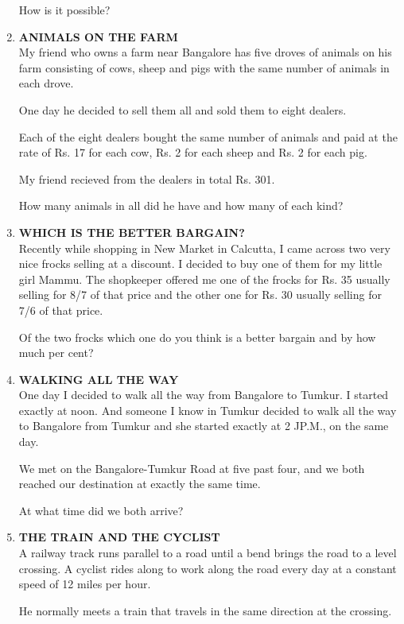 \documentclass[12pt]{article}
\begin{document}
\begin{enumerate}
How  is it possible? 
%
\item \textbf{ANIMALS  ON  THE  FARM} \\
My friend  who  owns  a farm  near  Bangalore  has  five droves  of animals  on his farm  consisting  of cows,  sheep and pigs  with  the  same  number  of animals  in each drove. 

One day he decided  to sell them  all and sold  them  to eight  dealers. 

Each  of the eight  dealers  bought  the same  number  of animals  and  paid  at the  rate  of Rs. 17 for  each  cow, Rs. 2 for each  sheep  and Rs. 2 for each  pig. 

My friend  recieved  from  the  dealers  in total  Rs. 301. 

How  many  animals  in all did he have  and  how  many of each  kind? 
%
\item \textbf{WHICH  IS THE  BETTER  BARGAIN?} \\
Recently  while  shopping  in New  Market  in Calcutta, I came  across  two very  nice  frocks  selling  at a discount. I decided  to buy  one  of them  for my little  girl Mammu. The shopkeeper  offered  me one of the  frocks  for Rs.  35 usually  selling  for 8/7 of  that  price  and the other  one for 
Rs. 30 usually  selling  for  7/6 of that  price. 

Of the two frocks  which  one do you think  is a better bargain  and by how  much  per cent? 
%
\item \textbf{WALKING  ALL  THE  WAY} \\
One day I decided  to walk  all the  way  from  Bangalore to Tumkur.  I started  exactly  at noon.  And  someone  I know  in Tumkur  decided  to walk  all the way  to Bangalore from  Tumkur  and  she  started  exactly  at 2 JP.M.,  on the same  day. 

We met  on the  Bangalore-Tumkur  Road  at five past four,  and we both  reached  our destination  at exactly  the same  time. 

At what  time  did we both  arrive? 
%
\item \textbf{THE  TRAIN  AND  THE  CYCLIST} \\
A railway  track  runs  parallel  to a road  until  a bend brings  the road  to a level  crossing.  A cyclist  rides  along to work  along  the road  every  day at a constant  speed  of 12 miles  per hour. 

He normally  meets  a train  that  travels  in the same direction  at the crossing. 


\end{enumerate}
\end{document}
